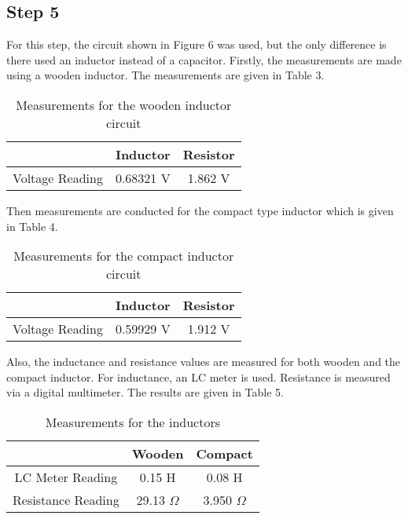 \documentclass[letterpaper,12pt]{article}
\begin{document}
\subsection{Step 5}
For this step, the circuit shown in Figure 6 was used, but the only difference is there used an inductor instead of a capacitor. Firstly, the measurements are made using a wooden inductor. The measurements are given in Table 3.
\begin{table}[H]
	\begin{center}
		\caption{Measurements for the wooden inductor circuit}
		\vspace{2mm}
		\begin{tabular}{||c | c | c||} 
		 \hline
		   & Inductor & Resistor \\ [0.5ex] 
		 \hline\hline
		 Voltage Reading & 0.68321 V & 1.862 V \\
		 \hline
		\end{tabular}
\end{center}
\end{table}
Then measurements are conducted for the compact type inductor which is given in Table 4.
\begin{table}[H]
	\begin{center}
		\caption{Measurements for the compact inductor circuit}
		\vspace{2mm}
		\begin{tabular}{||c | c | c||} 
		 \hline
		   & Inductor & Resistor \\ [0.5ex] 
		 \hline\hline
		 Voltage Reading & 0.59929 V & 1.912 V \\
		 \hline

		\end{tabular}
\end{center}
\end{table}
Also, the inductance and resistance values are measured for both wooden and the compact inductor. For inductance, an LC meter is used. Resistance is measured via a digital multimeter. The results are given in Table 5.
\begin{table}[H]
	\begin{center}
		\caption{Measurements for the inductors}
		\vspace{2mm}
		\begin{tabular}{||c | c | c||} 
		 \hline
		   & Wooden & Compact \\ [0.5ex] 
		 \hline\hline
		LC Meter Reading & 0.15 H & 0.08 H \\
		 \hline
		Resistance Reading & 29.13 \(\Omega\) & 3.950 \(\Omega\) \\
		 \hline
		\end{tabular}
\end{center}
\end{table}
\end{document}
